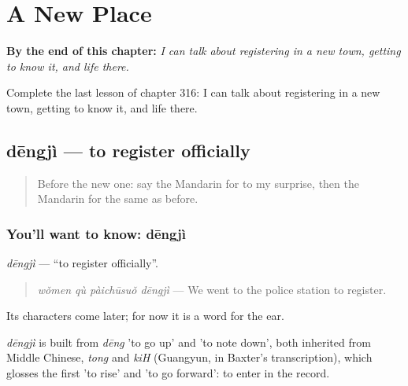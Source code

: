 
\chapter{A New Place}
\label{ch:zh-a-new-place}

\begin{chapteropening}
\textbf{By the end of this chapter:} \emph{I can talk about registering in a new town, getting to know it, and life there.}

Complete the last lesson of chapter 316: I can talk about registering in a new town, getting to know it, and life there.
\end{chapteropening}

\section[dēngjì]{dēngjì — to register officially}

\label{lesson:ZH-C316-dengji}



\begin{quote}
Before the new one: say the Mandarin for to my surprise, then the Mandarin for the same as before.
\end{quote}

\subsection*{You'll want to know: dēngjì}
\emph{dēngjì} — \textquotedblleft{}to register officially\textquotedblright{}.

\begin{quote}
\emph{wǒmen qù pàichūsuǒ dēngjì} — We went to the police station to register.
\end{quote}

Its characters come later; for now it is a word for the ear.

\begin{cousinweb}
\emph{dēngjì} is built from \emph{dēng} 'to go up' and  'to note down', both inherited from Middle Chinese, \emph{tong} and \emph{kiH} (Guangyun, in Baxter's transcription), which glosses the first 'to rise' and 'to go forward': to enter in the record.
\end{cousinweb}

